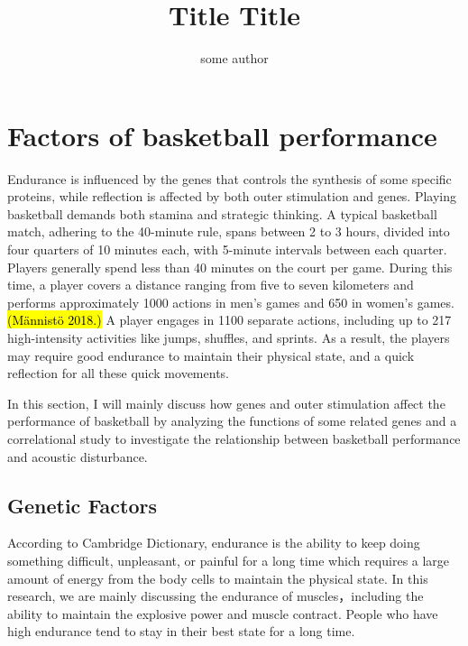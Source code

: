 \documentclass{article}
\title{Title Title}
\author{some author}
\begin{document}
\maketitle

\section{Factors of basketball performance}



Endurance is influenced by the genes that controls the synthesis of some specific proteins, while reflection is affected by both outer stimulation and genes. Playing basketball demands both stamina and strategic thinking. A typical basketball match, adhering to the 40-minute rule, spans between 2 to 3 hours, divided into four quarters of 10 minutes each, with 5-minute intervals between each quarter. Players generally spend less than 40 minutes on the court per game. During this time, a player covers a distance ranging from five to seven kilometers and performs approximately 1000 actions in men's games and 650 in women's games. \hl{(Männistö 2018.)}  A player engages in 1100 separate actions, including up to 217 high-intensity activities like jumps, shuffles, and sprints. \autocite[13-14]{raduScienceBasketball2018} As a result, the players may require good endurance to maintain their physical state, and a quick reflection for all these quick movements. 

In this section, I will mainly discuss how genes and outer stimulation affect the performance of basketball by analyzing the functions of some related genes and a correlational study to investigate the relationship between basketball performance and acoustic disturbance.

\subsection{Genetic Factors}

According to Cambridge Dictionary, endurance is the ability to keep doing something difficult, unpleasant, or painful for a long time which requires a large amount of energy from the body cells to maintain the physical state. In this research, we are mainly discussing the endurance of muscles，including the ability to maintain the explosive power and muscle contract. People who have high endurance tend to stay in their best state for a long time. 
\end{document}
